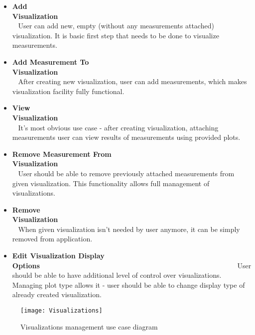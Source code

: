 \begin{itemize}

 \item {\bf Add Visualization}~~~~~~~~~~~~~~~~~~~~~~~~~~~~~~~~~~~~~~~~~~~~~~~~~~~~~~~~\linebreak
User can add new, empty (without any measurements attached) visualization. It is basic first step that needs to be done
to visualize measurements.

 \item {\bf Add Measurement To Visualization}~~~~~~~~~~~~~~~~~~~~~~~~~~~~~~~~~~~~~~~~~~~~~~~~~~~~~~~~\linebreak
After creating new visualization, user can add measurements, which makes visualization facility fully functional.

 \item {\bf View Visualization}~~~~~~~~~~~~~~~~~~~~~~~~~~~~~~~~~~~~~~~~~~~~~~~~~~~~~~~~\linebreak
It's most obvious use case - after creating visualization, attaching measurements user can view results of measurements
using provided plots.

 \item {\bf Remove Measurement From Visualization}~~~~~~~~~~~~~~~~~~~~~~~~~~~~~~~~~~~~~~~~~~~~~~~~~~~~~~~~\linebreak
User should be able to remove previously attached measurements from given visualization. This functionality allows full
management of visualizations.

 \item {\bf Remove Visualization}~~~~~~~~~~~~~~~~~~~~~~~~~~~~~~~~~~~~~~~~~~~~~~~~~~~~~~~~\linebreak
When given visualization isn't needed by user anymore, it can be simply removed from application.

 \item {\bf Edit Visualization Display Options}~~~~~~~~~~~~~~~~~~~~~~~~~~~~~~~~~~~~~~~~~~~~~~~~~~~~~~~~\linebreak
User should be able to have additional level of control over visualizations. Managing plot type allows it - user should
be able to change display type of already created visualization.

\end{itemize}



\begin{figure}[ht]
   \centering
   \texttt{[image: Visualizations]}
   \caption{Visualizations management use case diagram}
   \label{fig:usecases_visualisations}
\end{figure}